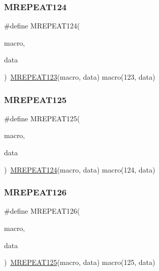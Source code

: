 \mbox{\label{group__group__sam0__utils__mrepeat_gaffd8596b4b1da63e7fa64cdeb5c91dd0}} 
\subsubsection{\texorpdfstring{MREPEAT124}{MREPEAT124}}
{\footnotesize\ttfamily \#define M\+R\+E\+P\+E\+A\+T124(\begin{DoxyParamCaption}\item[{}]{macro,  }\item[{}]{data }\end{DoxyParamCaption})~\mbox{\hyperlink{group__group__sam0__utils__mrepeat_gaf0802f3653fa2845f482ec6a119d9260}{M\+R\+E\+P\+E\+A\+T123}}(macro, data)   macro(123, data)}

\mbox{\label{group__group__sam0__utils__mrepeat_ga7396c439515bd5514d070147e165690a}} 
\subsubsection{\texorpdfstring{MREPEAT125}{MREPEAT125}}
{\footnotesize\ttfamily \#define M\+R\+E\+P\+E\+A\+T125(\begin{DoxyParamCaption}\item[{}]{macro,  }\item[{}]{data }\end{DoxyParamCaption})~\mbox{\hyperlink{group__group__sam0__utils__mrepeat_gaffd8596b4b1da63e7fa64cdeb5c91dd0}{M\+R\+E\+P\+E\+A\+T124}}(macro, data)   macro(124, data)}

\mbox{\label{group__group__sam0__utils__mrepeat_ga53040b0cd4095d945f277af00a28a94d}} 
\subsubsection{\texorpdfstring{MREPEAT126}{MREPEAT126}}
{\footnotesize\ttfamily \#define M\+R\+E\+P\+E\+A\+T126(\begin{DoxyParamCaption}\item[{}]{macro,  }\item[{}]{data }\end{DoxyParamCaption})~\mbox{\hyperlink{group__group__sam0__utils__mrepeat_ga7396c439515bd5514d070147e165690a}{M\+R\+E\+P\+E\+A\+T125}}(macro, data)   macro(125, data)}

